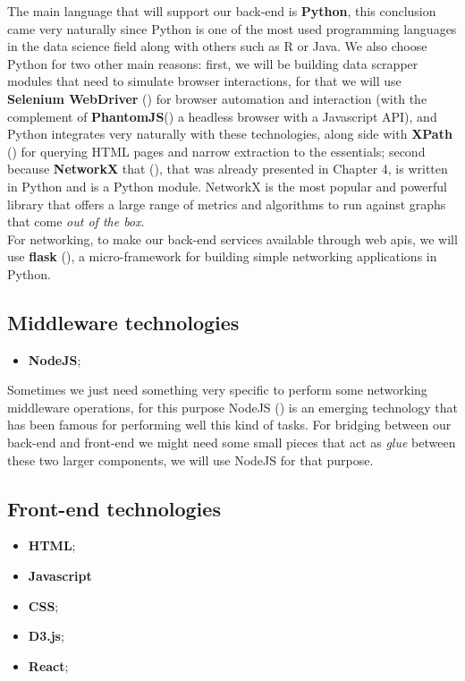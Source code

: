 The main language that will support our back-end is \textbf{Python}, this conclusion came very naturally since Python is one of the most used programming languages in the data science field along with others such as R or Java. We also choose Python for two other main reasons: first, we will be building data scrapper modules that need to simulate browser interactions, for that we will use \textbf{Selenium WebDriver} (\cite{documentation2013selenium}) for browser automation and interaction (with the complement of \textbf{PhantomJS}(\cite{hidayat2013phantomjs}) a headless browser with a Javascript API), and Python integrates very naturally with these technologies, along side with \textbf{XPath} (\cite{clark1999xml}) for querying HTML pages and narrow extraction to the essentials; second because \textbf{NetworkX} that (\cite{hagberg2013networkx}), that was already presented in Chapter 4, is written in Python and is a Python module. NetworkX is the most popular and powerful library that offers a large range of metrics and algorithms to run against graphs that come \textit{out of the box}.\\
\indent For networking, to make our back-end services available through web \glspl{api}, we will use \textbf{flask} (\cite{ronacher2015flask}), a micro-framework for building simple networking applications in Python.

\subsection{Middleware technologies}
\begin{itemize}
    \item \textbf{NodeJS};
\end{itemize}

Sometimes we just need something very specific to perform some networking middleware operations, for this purpose NodeJS (\cite{nodejs}) is an emerging technology
that has been famous for performing well this kind of tasks. For bridging between our back-end and front-end we might need some small pieces that act
as \textit{glue} between these two larger components, we will use NodeJS for that purpose.

\subsection{Front-end technologies}
\begin{itemize}
    \item \textbf{HTML};
    \item \textbf{Javascript}
    \item \textbf{CSS};
    \item \textbf{D3.js};
    \item \textbf{React};
\end{itemize}

